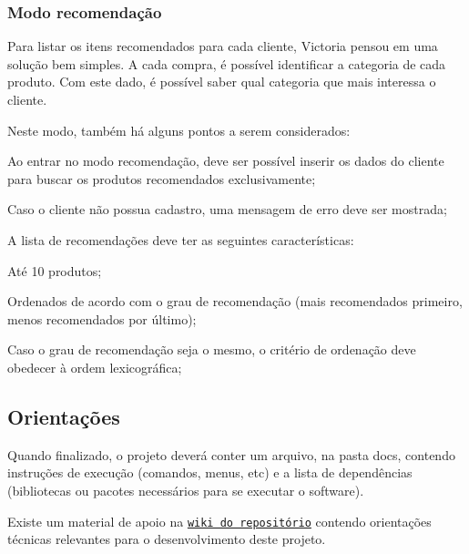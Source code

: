 \subsubsection*{Modo recomendação}

Para listar os itens recomendados para cada cliente, Victoria pensou em uma solução bem simples. A cada compra, é possível identificar a categoria de cada produto. Com este dado, é possível saber qual categoria que mais interessa o cliente.

Neste modo, também há alguns pontos a serem considerados\+:
\begin{DoxyItemize}
\item Ao entrar no modo recomendação, deve ser possível inserir os dados do cliente para buscar os produtos recomendados exclusivamente;
\item Caso o cliente não possua cadastro, uma mensagem de erro deve ser mostrada;
\item A lista de recomendações deve ter as seguintes características\+:
\begin{DoxyItemize}
\item Até 10 produtos;
\item Ordenados de acordo com o grau de recomendação (mais recomendados primeiro, menos recomendados por último);
\item Caso o grau de recomendação seja o mesmo, o critério de ordenação deve obedecer à ordem lexicográfica;
\end{DoxyItemize}
\end{DoxyItemize}

\subsection*{Orientações}

Quando finalizado, o projeto deverá conter um arquivo, na pasta {\ttfamily docs}, contendo instruções de execução (comandos, menus, etc) e a lista de dependências (bibliotecas ou pacotes necessários para se executar o software).

Existe um material de apoio na \href{https://gitlab.com/oofga/eps/eps_2019_2/ep1/wikis/Home}{\tt wiki do repositório} contendo orientações técnicas relevantes para o desenvolvimento deste projeto. 